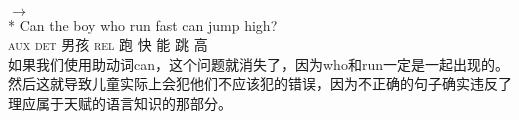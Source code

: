 \glt {}\\
$\to$\\
 {}* \gll Can the boy who run fast can jump high?\\
          \textsc{aux} \textsc{det} 男孩 \textsc{rel} 跑 快 能 跳 高\\
\zl
如果我们使用助动词can，这个问题就消失了，因为who和run一定是一起出现的。然后这就导致儿童实际上会犯他们不应该犯的错误，因为不正确的句子确实违反了理应属于天赋的语言知识的那部分。

